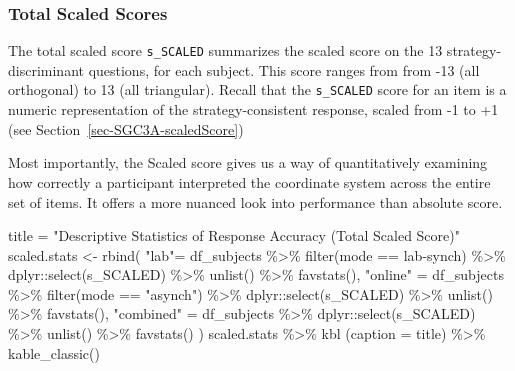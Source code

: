 \documentclass[
  letterpaper,
  DIV=11,
  numbers=noendperiod]{scrreprt}
\newenvironment{Shaded}{\begin{snugshade}}{\end{snugshade}}
\newcommand{\AttributeTok}[1]{\textcolor[rgb]{0.40,0.45,0.13}{#1}}
\newcommand{\FunctionTok}[1]{\textcolor[rgb]{0.28,0.35,0.67}{#1}}
\newcommand{\NormalTok}[1]{\textcolor[rgb]{0.00,0.23,0.31}{#1}}
\newcommand{\OtherTok}[1]{\textcolor[rgb]{0.00,0.23,0.31}{#1}}
\newcommand{\SpecialCharTok}[1]{\textcolor[rgb]{0.37,0.37,0.37}{#1}}
\newcommand{\StringTok}[1]{\textcolor[rgb]{0.13,0.47,0.30}{#1}}
\begin{document}
\hypertarget{total-scaled-scores}{%
\subsubsection{Total Scaled Scores}\label{total-scaled-scores}}

The total scaled score \texttt{s\_SCALED} summarizes the scaled score on
the 13 strategy-discriminant questions, for each subject. This score
ranges from from -13 (all orthogonal) to 13 (all triangular). Recall
that the \texttt{s\_SCALED} score for an item is a numeric
representation of the strategy-consistent response, scaled from -1 to +1
(see Section~\ref{sec-SGC3A-scaledScore})

Most importantly, the Scaled score gives us a way of quantitatively
examining how correctly a participant interpreted the coordinate system
across the entire set of items. It offers a more nuanced look into
performance than absolute score.

\begin{Shaded}
\begin{Highlighting}[]
\NormalTok{title }\OtherTok{=} \StringTok{"Descriptive Statistics of Response Accuracy (Total Scaled Score)"}
\NormalTok{scaled.stats }\OtherTok{\textless{}{-}} \FunctionTok{rbind}\NormalTok{(}
  \StringTok{"lab"}\OtherTok{=}\NormalTok{ df\_subjects }\SpecialCharTok{\%\textgreater{}\%} \FunctionTok{filter}\NormalTok{(mode }\SpecialCharTok{==} \StringTok{\textquotesingle{}lab{-}synch\textquotesingle{}}\NormalTok{) }\SpecialCharTok{\%\textgreater{}\%}\NormalTok{ dplyr}\SpecialCharTok{::}\FunctionTok{select}\NormalTok{(s\_SCALED) }\SpecialCharTok{\%\textgreater{}\%} \FunctionTok{unlist}\NormalTok{() }\SpecialCharTok{\%\textgreater{}\%} \FunctionTok{favstats}\NormalTok{(),}
  \StringTok{"online"} \OtherTok{=}\NormalTok{ df\_subjects }\SpecialCharTok{\%\textgreater{}\%} \FunctionTok{filter}\NormalTok{(mode }\SpecialCharTok{==} \StringTok{"asynch"}\NormalTok{) }\SpecialCharTok{\%\textgreater{}\%}\NormalTok{ dplyr}\SpecialCharTok{::}\FunctionTok{select}\NormalTok{(s\_SCALED) }\SpecialCharTok{\%\textgreater{}\%} \FunctionTok{unlist}\NormalTok{() }\SpecialCharTok{\%\textgreater{}\%} \FunctionTok{favstats}\NormalTok{(),}
  \StringTok{"combined"} \OtherTok{=}\NormalTok{ df\_subjects }\SpecialCharTok{\%\textgreater{}\%}\NormalTok{ dplyr}\SpecialCharTok{::}\FunctionTok{select}\NormalTok{(s\_SCALED) }\SpecialCharTok{\%\textgreater{}\%} \FunctionTok{unlist}\NormalTok{() }\SpecialCharTok{\%\textgreater{}\%} \FunctionTok{favstats}\NormalTok{()}
\NormalTok{) }
\NormalTok{scaled.stats }\SpecialCharTok{\%\textgreater{}\%} \FunctionTok{kbl}\NormalTok{ (}\AttributeTok{caption =}\NormalTok{ title) }\SpecialCharTok{\%\textgreater{}\%} \FunctionTok{kable\_classic}\NormalTok{()}
\end{Highlighting}
\end{Shaded}
\end{document}
